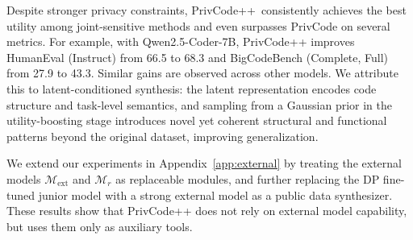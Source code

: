 \documentclass{article}
\theoremstyle{plain}
\theoremstyle{definition}
\theoremstyle{remark}
\def \toolname{PrivCode++}
\begin{document}
Despite stronger privacy constraints, \toolname \ consistently achieves the best utility among joint-sensitive methods and even surpasses PrivCode on several metrics. For example, with Qwen2.5-Coder-7B, \toolname{} improves HumanEval (Instruct) from 66.5 to 68.3 and BigCodeBench (Complete, Full) from 27.9 to 43.3. Similar gains are observed across other models. We attribute this to latent-conditioned synthesis: the latent representation encodes code structure and task-level semantics, and sampling from a Gaussian prior in the utility-boosting stage introduces novel yet coherent structural and functional patterns beyond the original dataset, improving generalization. 

We extend our experiments in Appendix~\ref{app:external} by treating the external models $\mathcal{M}_{\text{ext}}$ and $\mathcal{M}_r$ as replaceable modules, and further replacing the DP fine-tuned junior model with a strong external model as a public data synthesizer. These results show that \toolname{} does not rely on external model capability, but uses them only as auxiliary tools.
\end{document}
